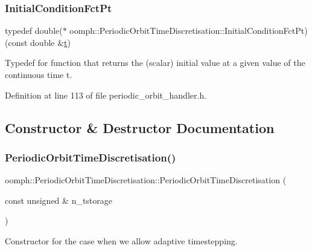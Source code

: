 \subsubsection{\texorpdfstring{Initial\+Condition\+Fct\+Pt}{InitialConditionFctPt}}
{\footnotesize\ttfamily typedef double($\ast$ oomph\+::\+Periodic\+Orbit\+Time\+Discretisation\+::\+Initial\+Condition\+Fct\+Pt) (const double \&\hyperlink{cfortran_8h_af6f0bd3dc13317f895c91323c25c2b8f}{t})}



Typedef for function that returns the (scalar) initial value at a given value of the continuous time t. 



Definition at line 113 of file periodic\+\_\+orbit\+\_\+handler.\+h.



\subsection{Constructor \& Destructor Documentation}
\mbox{\label{classoomph_1_1PeriodicOrbitTimeDiscretisation_a7167c51f5a15cd10f9cf1d534534d0ab}} 
\subsubsection{\texorpdfstring{Periodic\+Orbit\+Time\+Discretisation()}{PeriodicOrbitTimeDiscretisation()}\hspace{0.1cm}{\footnotesize\ttfamily [1/2]}}
{\footnotesize\ttfamily oomph\+::\+Periodic\+Orbit\+Time\+Discretisation\+::\+Periodic\+Orbit\+Time\+Discretisation (\begin{DoxyParamCaption}\item[{const unsigned \&}]{n\+\_\+tstorage }\end{DoxyParamCaption})\hspace{0.3cm}{\ttfamily [inline]}}



Constructor for the case when we allow adaptive timestepping. 



